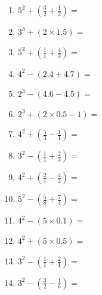 \documentclass[12pt]{article}
\begin{document}
\begin{enumerate}
\item \large $ 5^{2} + (\frac{3}{2} + \frac{1}{2}) = $ \vspace{1.4cm}
\item \large $ 3^{3} + (2 \times 1.5) = $ \vspace{1.4cm}
\newpage
\item \large $ 5^{2} + (\frac{1}{1} + \frac{4}{3}) = $ \vspace{1.4cm}
\item \large $ 4^{2} - (2.4 + 4.7) = $ \vspace{1.4cm}
\item \large $ 2^{3} - (4.6 - 4.5) = $ \vspace{1.4cm}
\item \large $ 2^{3} + (2 \times 0.5 - 1) = $ \vspace{1.4cm}
\item \large $ 4^{2} + (\frac{5}{3} - \frac{1}{1}) = $ \vspace{1.4cm}
\item \large $ 3^{2} - (\frac{1}{1} + \frac{2}{3}) = $ \vspace{1.4cm}
\item \large $ 4^{2} + (\frac{2}{1} - \frac{4}{3}) = $ \vspace{1.4cm}
\item \large $ 5^{2} - (\frac{5}{8} + \frac{7}{4}) = $ \vspace{1.4cm}
\item \large $ 4^{2} - (5 \times 0.1) = $ \vspace{1.4cm}
\item \large $ 4^{2} + (5 \times 0.5) = $ \vspace{1.4cm}
\newpage
\item \large $ 3^{2} - (\frac{1}{1} + \frac{2}{1}) = $ \vspace{1.4cm}
\item \large $ 3^{2} - (\frac{3}{2} - \frac{1}{6}) = $ \vspace{1.4cm}
\end{enumerate}
\newpage
\end{document}
